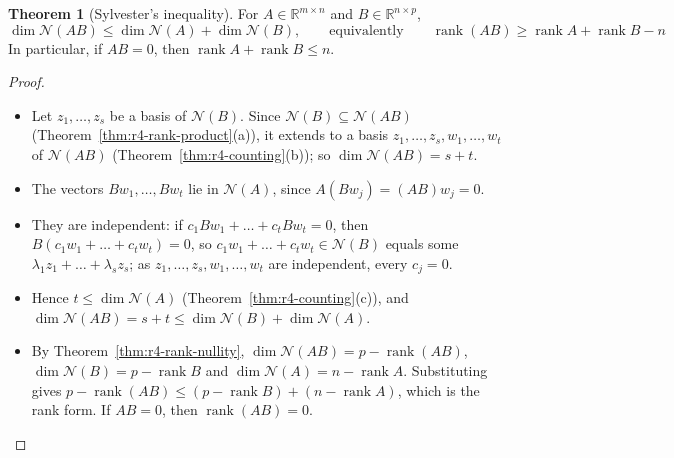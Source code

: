 \documentclass[12pt]{article}
\newcommand{\R}{\mathbb R}
\DeclareMathOperator{\rank}{rank}
\theoremstyle{definition}
\newtheorem{theorem}{Theorem}
\begin{document}
\begin{theorem}[Sylvester's inequality]\label{thm:r4-sylvester}
For \(A\in\R^{m\times n}\) and \(B\in\R^{n\times p}\),
\[
\dim\mathcal N(AB)\leqslant\dim\mathcal N(A)+\dim\mathcal N(B),\qquad\text{equivalently}\qquad
\rank(AB)\geqslant\rank A+\rank B-n
\]
In particular, if \(AB=0\), then \(\rank A+\rank B\leqslant n\).
\end{theorem}
\begin{proof}
\begin{itemize}
\item Let \(z_1,\dots,z_s\) be a basis of \(\mathcal N(B)\). Since
\(\mathcal N(B)\subseteq\mathcal N(AB)\) (Theorem~\ref{thm:r4-rank-product}(a)), it extends to a
basis \(z_1,\dots,z_s,w_1,\dots,w_t\) of \(\mathcal N(AB)\) (Theorem~\ref{thm:r4-counting}(b));
so \(\dim\mathcal N(AB)=s+t\).
\item The vectors \(Bw_1,\dots,Bw_t\) lie in \(\mathcal N(A)\), since \(A(Bw_j)=(AB)w_j=0\).
\item They are independent: if \(c_1Bw_1+\dots+c_tBw_t=0\), then \(B(c_1w_1+\dots+c_tw_t)=0\), so
\(c_1w_1+\dots+c_tw_t\in\mathcal N(B)\) equals some \(\lambda_1z_1+\dots+\lambda_sz_s\); as
\(z_1,\dots,z_s,w_1,\dots,w_t\) are independent, every \(c_j=0\).
\item Hence \(t\leqslant\dim\mathcal N(A)\) (Theorem~\ref{thm:r4-counting}(c)), and
\(\dim\mathcal N(AB)=s+t\leqslant\dim\mathcal N(B)+\dim\mathcal N(A)\).
\item By Theorem~\ref{thm:r4-rank-nullity}, \(\dim\mathcal N(AB)=p-\rank(AB)\),
\(\dim\mathcal N(B)=p-\rank B\) and \(\dim\mathcal N(A)=n-\rank A\). Substituting gives
\(p-\rank(AB)\leqslant(p-\rank B)+(n-\rank A)\), which is the rank form. If \(AB=0\), then
\(\rank(AB)=0\).\qedhere
\end{itemize}
\end{proof}
\end{document}
